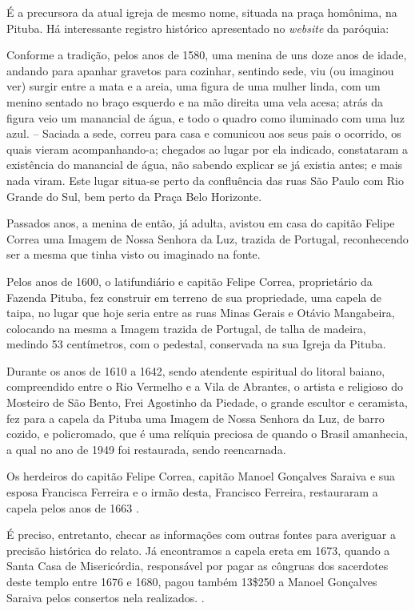É a precursora da atual igreja de mesmo nome, situada na praça homônima, na Pituba. Há interessante registro histórico apresentado no \textit{website} da paróquia:

\begin{citacao}
Conforme a tradição, pelos anos de 1580, uma menina de uns doze anos de idade, andando para apanhar gravetos para cozinhar, sentindo sede, viu (ou imaginou ver) surgir entre a mata e a areia, uma figura de uma mulher linda, com um menino sentado no braço esquerdo e na mão direita uma vela acesa; atrás da figura veio um manancial de água, e todo o quadro como iluminado com uma luz azul. – Saciada a sede, correu para casa e comunicou aos seus pais o ocorrido, os quais vieram acompanhando-a; chegados ao lugar por ela indicado, constataram a existência do manancial de água, não sabendo explicar se já existia antes; e mais nada viram. Este lugar situa-se perto da confluência das ruas São Paulo com Rio Grande do Sul, bem perto da Praça Belo Horizonte.

Passados anos, a menina de então, já adulta, avistou em casa do capitão Felipe Correa uma Imagem de Nossa Senhora da Luz, trazida de Portugal, reconhecendo ser a mesma que tinha visto ou imaginado na fonte.

Pelos anos de 1600, o latifundiário e capitão Felipe Correa, proprietário da Fazenda Pituba, fez construir em terreno de sua propriedade, uma capela de taipa, no lugar que hoje seria entre as ruas Minas Gerais e Otávio Mangabeira, colocando na mesma a Imagem trazida de Portugal, de talha de madeira, medindo 53 centímetros, com o pedestal, conservada na sua Igreja da Pituba.

Durante os anos de 1610 a 1642, sendo atendente espiritual do litoral baiano, compreendido entre o Rio Vermelho e a Vila de Abrantes, o artista e religioso do Mosteiro de São Bento, Frei Agostinho da Piedade, o grande escultor e ceramista, fez para a capela da Pituba uma Imagem de Nossa Senhora da Luz, de barro cozido, e policromado, que é uma relíquia preciosa de quando o Brasil amanhecia, a qual no ano de 1949 foi restaurada, sendo reencarnada.

Os herdeiros do capitão Felipe Correa, capitão Manoel Gonçalves Saraiva e sua esposa Francisca Ferreira e o irmão desta, Francisco Ferreira, restauraram a capela pelos anos de 1663 \cite{fernandez_historia_1969}.
\end{citacao}

É preciso, entretanto, checar as informações com outras fontes para averiguar a precisão histórica do relato. Já encontramos a capela ereta em 1673, quando a Santa Casa de Misericórdia, responsável por pagar as côngruas dos sacerdotes deste templo entre 1676 e 1680, pagou também 13\$250 a Manoel Gonçalves Saraiva pelos consertos nela realizados. \cite[p.~11]{ott_engenhos_1996}. 

